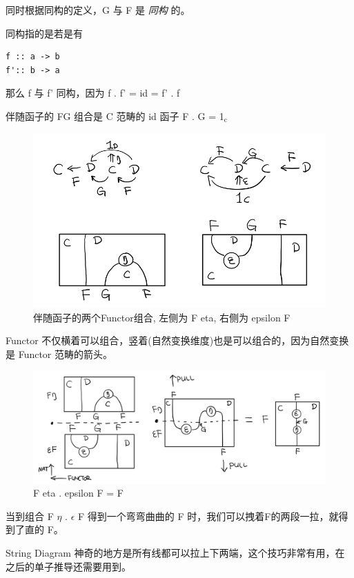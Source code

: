 \documentclass[11pt]{tufte-book}
\begin{document}
同时根据同构的定义，G 与 F 是 \emph{同构} 的。

同构指的是若是有
\begin{verbatim}
f :: a -> b
f':: b -> a
\end{verbatim}

那么 f 与 f' 同构，因为 f . f' = id = f' . f

伴随函子的 FG 组合是 C 范畴的 id 函子 F . G = 1\(_{\text{c}}\)

\begin{figure}[htbp]
\centering
\includegraphics[width=.9\linewidth]{images/p1-ajunction-functor-compose.png}
\caption{伴随函子的两个Functor组合, 左侧为 F eta, 右侧为 epsilon F}
\end{figure}

Functor 不仅横着可以组合，竖着(自然变换维度)也是可以组合的，因为自然变换是 Functor 范畴的箭头。

\begin{figure}[htbp]
\centering
\includegraphics[width=.9\linewidth]{images/p1-ajunction-functor-compose-nat.png}
\caption{F eta . epsilon F  = F}
\end{figure}

当到组合 F \(\eta\) . \(\epsilon\) F 得到一个弯弯曲曲的 F 时，我们可以拽着F的两段一拉，就得到了直的 F。

String Diagram 神奇的地方是所有线都可以拉上下两端，这个技巧非常有用，在之后的单子推导还需要用到。
\end{document}

